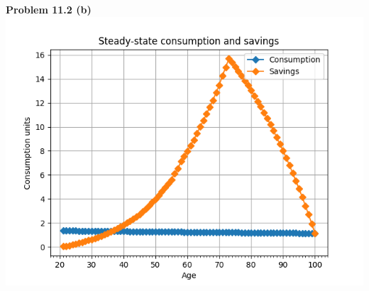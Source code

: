 \documentclass[letterpaper,12pt]{article}
\theoremstyle{definition}
\begin{document}
\noindent\textbf{Problem 11.2 (b)}\\
\includegraphics[scale=0.5]{images/ss_bc.png}
\end{document}
